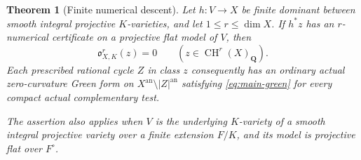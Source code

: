\documentclass[11pt]{article}
\newtheorem{theorem}{Theorem}[section]
\theoremstyle{definition}
\theoremstyle{remark}
\numberwithin{equation}{section}
\newcommand{\CH}{\operatorname{CH}}
\newcommand{\an}{\mathrm{an}}
\newcommand{\Ob}{\mathfrak o}
\begin{document}
\begin{theorem}[Finite numerical descent]\label{thm:finite-numerical}
Let $h:V\to X$ be finite dominant between smooth integral
projective $K$-varieties, and let $1\le r\le\dim X$.  If $h^*z$
has an $r$-numerical certificate on a projective flat model of $V$,
then
\[
                     \Ob^r_{X,K}(z)=0
                     \qquad(z\in\CH^r(X)_{\mathbf Q}).
\]
Each prescribed rational cycle $Z$ in class $z$ consequently has
an ordinary actual zero-curvature Green form on
$X^{\an}\setminus|Z|^{\an}$ satisfying \eqref{eq:main-green}
for every compact actual complementary test.

The assertion also applies when $V$ is the underlying $K$-variety
of a smooth integral projective variety over a finite extension
$F/K$, and its model is projective flat over $F^\circ$.
\end{theorem}
\end{document}
